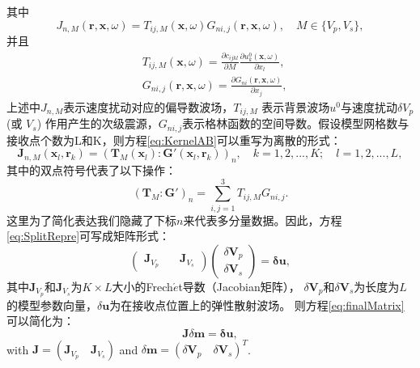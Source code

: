其中
\begin{equation}
        J_{n,M}(\mathbf{r,x},\omega)=
        T_{ij,M}(\mathbf{x},\omega)G_{ni,j}(\mathbf{r,x},\omega), \quad M\in\{V_p,V_s\},
\label{eq:KernelAB}
\end{equation}
并且
\begin{equation}
\begin{split}
                &T_{ij,M}(\mathbf{x},\omega)=\frac{\partial c_{ijkl}}{\partial M}\frac{\partial
                        u^0_{k}(\mathbf{x},\omega)}{\partial x_l},\\ 
                        &G_{ni,j}(\mathbf{r,x},\omega)=\frac{\partial
                                G_{ni}(\mathbf{r},\mathbf{x},\omega)}{\partial x_j},
\end{split}
\label{eq:traction}
\end{equation}
上述中$J_{n,M}$表示速度扰动对应的偏导数波场\cite[]{pratt1998gauss}，$T_{ij,M}$ 表示背景波场$u^0$与速度扰动$\delta V_p$ (或 $V_s$)
作用产生的次级震源，$G_{ni,j}$表示格林函数的空间导数。假设模型网格数与接收点个数为L和K，则方程\eqref{eq:KernelAB}可以重写为离散的形式：
\begin{equation}
        \mathbf{J}_{n,M}(\mathbf{x}_l,\mathbf{r}_k)=
        (\mathbf{T}_M(\mathbf{x}_l):\mathbf{G}'(\mathbf{x}_l,\mathbf{r}_k))_n,\quad
        k=1,2,...,K;\quad l=1, 2,...,L,
        \label{eq:EquivFre}
\end{equation}
其中的双点符号代表了以下操作：
\begin{equation}
    (\mathbf{T}_M:\mathbf{G}')_{n}=\sum_{i,j=1}^{3}T_{ij,M}G_{ni,j}.
    \label{eq:contraction}
\end{equation}
这里为了简化表达我们隐藏了下标$n$来代表多分量数据。因此，方程\eqref{eq:SplitRepre}可写成矩阵形式：
\begin{equation}
            \begin{pmatrix}
                        \mathbf{J}_{V_p}&\quad\mathbf{J}_{V_s}
    \end{pmatrix}
    \begin{pmatrix}
       \delta  \mathbf{V}_p\\
       \delta \mathbf{V}_s
    \end{pmatrix}
    =
        \mathbf{\delta u},
        \label{eq:finalMatrix}
\end{equation}
其中$\mathbf{J}_{V_p}$和$\mathbf{J}_{V_s}$为$K\times L$大小的Frech{$\acute{e}$}t导数（Jacobian矩阵），
$\delta \mathbf{V}_p$和$\delta \mathbf{V}_s$为长度为$L$的模型参数向量，$\delta \mathbf{u}$为在接收点位置上的弹性散射波场。
则方程\eqref{eq:finalMatrix}可以简化为：
\begin{equation}
        \mathbf{J}\delta \mathbf{m}
    =
        \mathbf{\delta u},
        \label{eq:finalMatrixshort}
\end{equation}
with $\mathbf{J}=(\mathbf{J}_{V_p}\quad\mathbf{J}_{V_s})$ and
$\delta \mathbf{m}=(\delta\mathbf{V}_p \quad \delta\mathbf{V}_s)^T$.

